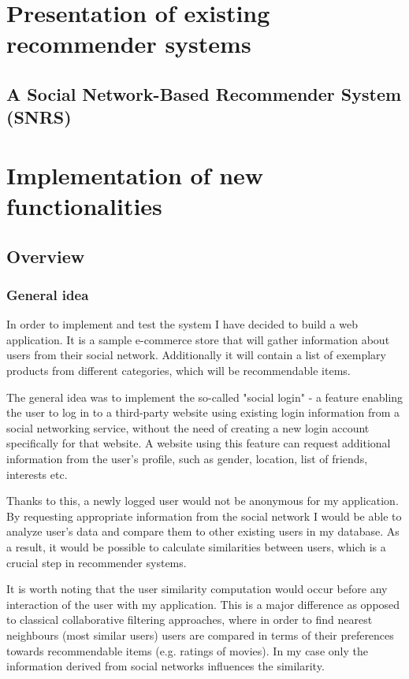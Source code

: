 \documentclass[12pt]{report}
\begin{document}
\chapter{Presentation of existing recommender systems}

\section{A Social Network-Based Recommender System (SNRS)}


\chapter{Implementation of new functionalities}

\section{Overview}
\subsection{General idea}
In order to implement and test the system I have decided to build a web application. It is a sample e-commerce store that will gather information about users from their social network. Additionally it will contain a list of exemplary products from different categories, which will be recommendable items. 

The general idea was to implement the so-called "social login" - \cite{social_login} a feature enabling the user to log in to a third-party website using existing login information from a social networking service, without the need of creating a new login account specifically for that website. A website using this feature can request additional information from the user's profile, such as gender, location, list of friends, interests etc. 

Thanks to this, a newly logged user would not be anonymous for my application. By requesting appropriate information from the social network I would be able to analyze user's data and compare them to other existing users in my database. As a result, it would be possible to calculate similarities between users, which is a crucial step in recommender systems.

It is worth noting that the user similarity computation would occur before any interaction of the user with my application. This is a major difference as opposed to classical collaborative filtering approaches, where in order to find nearest neighbours (most similar users) users are compared in terms of their preferences towards recommendable items (e.g. ratings of movies). In my case only the information derived from social networks influences the similarity.
\end{document}
